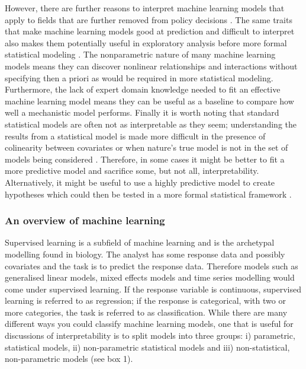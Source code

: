 \documentclass[10pt,]{article}
\begin{document}
However, there are further reasons to interpret machine learning models that apply to fields that are further removed from policy decisions \citep{elith2009species}. The same traits that make machine learning models good at prediction and difficult to interpret also makes them potentially useful in exploratory analysis before more formal statistical modeling \citep{zhao2017causal}. The nonparametric nature of many machine learning models means they can discover nonlinear relationships and interactions without specifying then a priori as would be required in more statistical modeling. Furthermore, the lack of expert domain knowledge needed to fit an effective machine learning model means they can be useful as a baseline to compare how well a mechanistic model performs. Finally it is worth noting that standard statistical models are often not as interpretable as they seem; understanding the results from a statistical model is made more difficult in the presence of colinearity between covariates or when nature's true model is not in the set of models being considered \citep{lyddon2018nonparametric, yao2017using}. Therefore, in some cases it might be better to fit a more predictive model and sacrifice some, but not all, interpretability. Alternatively, it might be useful to use a highly predictive model to create hypotheses which could then be tested in a more formal statistical framework \citep{zhao2017causal}.

\subsubsection{An overview of machine learning}\label{an-overview-of-machine-learning}

Supervised learning is a subfield of machine learning and is the archetypal modelling found in biology. The analyst has some response data and possibly covariates and the task is to predict the response data. Therefore models such as generalised linear models, mixed effects models and time series modelling would come under supervised learning. If the response variable is continuous, supervised learning is referred to as regression; if the response is categorical, with two or more categories, the task is referred to as classification. While there are many different ways you could classify machine learning models, one that is useful for discussions of interpretability is to split models into three groups: i) parametric, statistical models, ii) non-parametric statistical models and iii) non-statistical, non-parametric models (see box 1).
\end{document}
